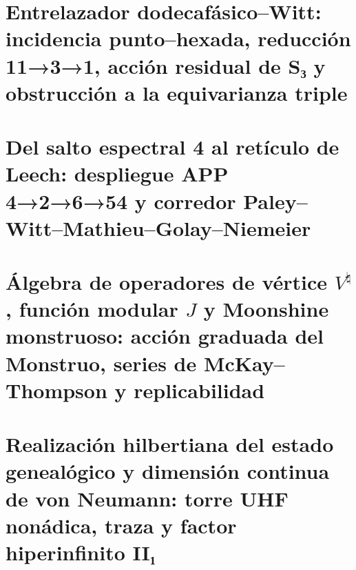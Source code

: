 \chapter{Entrelazador dodecafásico–Witt: incidencia punto–hexada, reducción 11→3→1, acción residual de S₃ y obstrucción a la equivarianza triple}
\label{chap:sucesor-102-20}
\begin{HMTScientificOwnerSubordinated}

\end{HMTScientificOwnerSubordinated}

\chapter{Del salto espectral 4 al retículo de Leech: despliegue APP 4→2→6→54 y corredor Paley–Witt–Mathieu–Golay–Niemeier}
\label{chap:sucesor-102-21}



\chapter{Álgebra de operadores de vértice \texorpdfstring{\(V^\natural\)}{V^♮}, función modular \texorpdfstring{\(J\)}{J} y Moonshine monstruoso: acción graduada del Monstruo, series de McKay–Thompson y replicabilidad}
\label{chap:sucesor-102-22}
\label{chap:voa-moonshine-rector}






\chapter{Realización hilbertiana del estado genealógico y dimensión continua de von Neumann: torre UHF nonádica, traza y factor hiperinfinito II₁}
\label{chap:sucesor-102-23}


